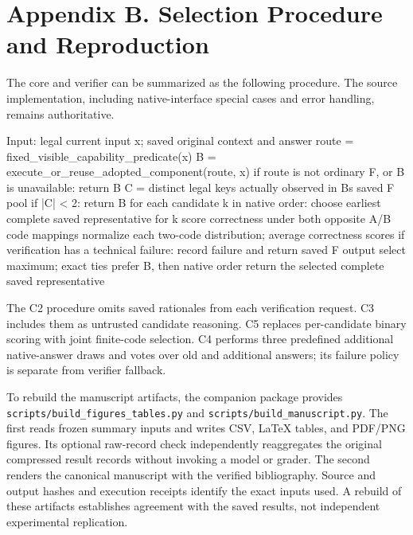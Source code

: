 \documentclass[
  english,
  11pt,
]{article}
\newenvironment{Shaded}{}{}
\newcommand{\NormalTok}[1]{#1}
\begin{document}
\section*{Appendix B. Selection Procedure and
Reproduction}\label{appendix-b.-selection-procedure-and-reproduction}

The core and verifier can be summarized as the following procedure. The
source implementation, including native-interface special cases and
error handling, remains authoritative.

\begin{Shaded}
\begin{Highlighting}[]
\NormalTok{Input: legal current input x; saved original context and answer}
\NormalTok{route = fixed\_visible\_capability\_predicate(x)}
\NormalTok{B = execute\_or\_reuse\_adopted\_component(route, x)}
\NormalTok{if route is not ordinary F, or B is unavailable:}
\NormalTok{    return B}
\NormalTok{C = distinct legal keys actually observed in B\textquotesingle{}s saved F pool}
\NormalTok{if |C| \textless{} 2:}
\NormalTok{    return B}
\NormalTok{for each candidate k in native order:}
\NormalTok{    choose earliest complete saved representative for k}
\NormalTok{    score correctness under both opposite A/B code mappings}
\NormalTok{    normalize each two{-}code distribution; average correctness scores}
\NormalTok{if verification has a technical failure:}
\NormalTok{    record failure and return saved F output}
\NormalTok{select maximum; exact ties prefer B, then native order}
\NormalTok{return the selected complete saved representative}
\end{Highlighting}
\end{Shaded}

The C2 procedure omits saved rationales from each verification request.
C3 includes them as untrusted candidate reasoning. C5 replaces
per-candidate binary scoring with joint finite-code selection. C4
performs three predefined additional native-answer draws and votes over
old and additional answers; its failure policy is separate from verifier
fallback.

To rebuild the manuscript artifacts, the companion package provides
\texttt{scripts/build\_figures\_tables.py} and
\texttt{scripts/build\_manuscript.py}. The first reads frozen summary
inputs and writes CSV, LaTeX tables, and PDF/PNG figures. Its optional
raw-record check independently reaggregates the original compressed
result records without invoking a model or grader. The second renders
the canonical manuscript with the verified bibliography. Source and
output hashes and execution receipts identify the exact inputs used. A
rebuild of these artifacts establishes agreement with the saved results,
not independent experimental replication.
\end{document}
